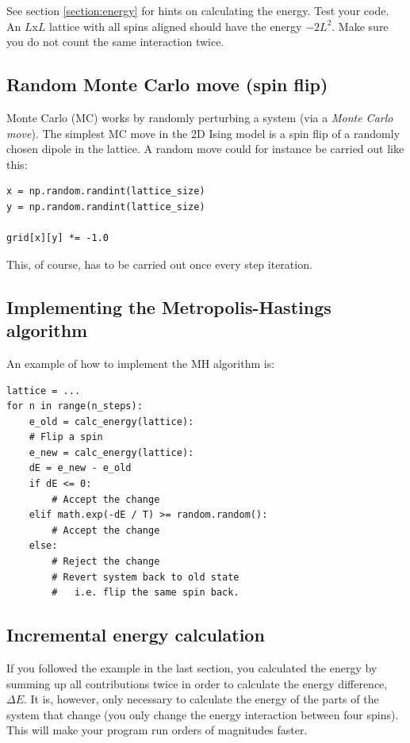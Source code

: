\documentclass{article}
\begin{document}
See section \ref{section:energy} for hints on calculating the energy.
Test your code.
An $L$x$L$ lattice with all spins aligned should have the energy $-2L^2$.
Make sure you do not count the same interaction twice.\\

\subsection{Random Monte Carlo move (spin flip)}

Monte Carlo (MC) works by randomly perturbing a system (via a \textit{Monte Carlo move}).
The simplest MC move in the 2D Ising model is a spin flip of a randomly chosen dipole in the lattice.
A random move could for instance be carried out like this:

\begin{lstlisting}
x = np.random.randint(lattice_size)
y = np.random.randint(lattice_size)

grid[x][y] *= -1.0
\end{lstlisting}

This, of course, has to be carried out once every step iteration.

\subsection{Implementing the Metropolis-Hastings algorithm}

An example of how to implement the MH algorithm is: 

\begin{lstlisting}
lattice = ...
for n in range(n_steps):
    e_old = calc_energy(lattice):
    # Flip a spin
    e_new = calc_energy(lattice):
    dE = e_new - e_old
    if dE <= 0:
        # Accept the change
    elif math.exp(-dE / T) >= random.random():
        # Accept the change
    else:
        # Reject the change
        # Revert system back to old state
        #   i.e. flip the same spin back.
\end{lstlisting}

\subsection{Incremental energy calculation}

If you followed the example in the last section, you calculated the energy by summing up all contributions twice in order to calculate the energy difference, $\Delta E$.
It is, however, only necessary to calculate the energy of the parts of the system that change (you only change the energy interaction between four spins).
This will make your program run orders of magnitudes faster.\\
\end{document}

